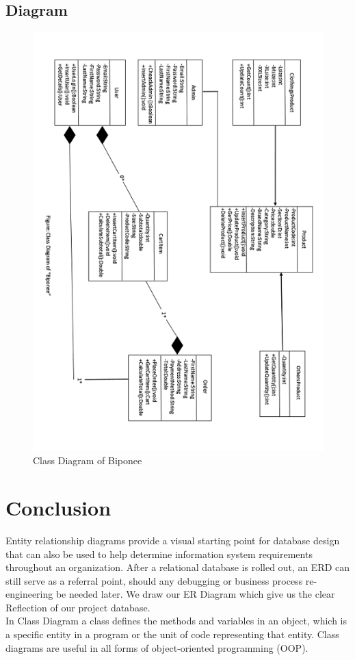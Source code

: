   \subsection{Diagram}
  \begin{figure}
 \centering
\includegraphics{figures/classfinal.png}
\caption{Class Diagram of Biponee}
\end{figure}


\newpage

\section{Conclusion}
 Entity relationship diagrams provide a visual starting point for database design that can also be used to help determine information system requirements throughout an organization. After a relational database is rolled out, an ERD can still serve as a referral point, should any debugging or business process re-engineering be needed later. We draw our ER Diagram which give us the clear Reflection of our project database.\\
 In Class Diagram a class defines the methods and variables in an object, which is a specific entity in a program or the unit of code representing that entity. Class diagrams are useful in all forms of object-oriented programming (OOP). 